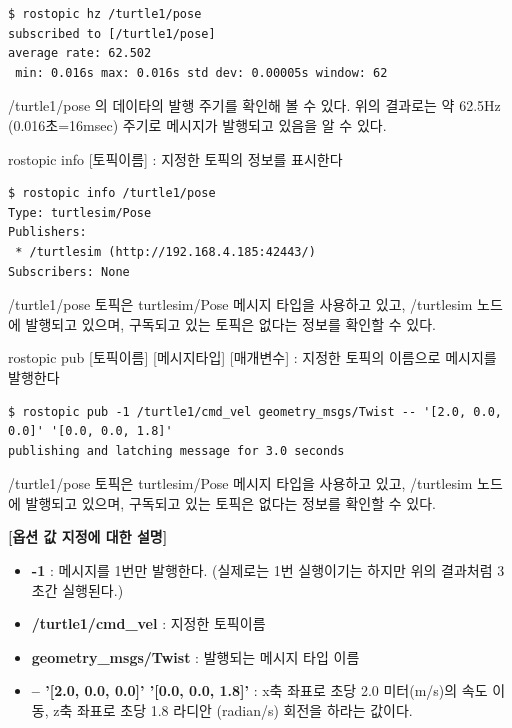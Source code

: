 \begin{lstlisting}[language=ROS]
$ rostopic hz /turtle1/pose 
subscribed to [/turtle1/pose]
average rate: 62.502
 min: 0.016s max: 0.016s std dev: 0.00005s window: 62
\end{lstlisting}

\noindent
/turtle1/pose 의 데이타의 발행 주기를 확인해 볼 수 있다. 위의 결과로는 약 62.5Hz (0.016초=16msec) 주기로 메시지가 발행되고 있음을 알 수 있다.

\vspace{\baselineskip}
\noindent
{}\circled{\thenum} rostopic info [토픽이름] : 지정한 토픽의 정보를 표시한다

\begin{lstlisting}[language=ROS]
$ rostopic info /turtle1/pose 
Type: turtlesim/Pose
Publishers: 
 * /turtlesim (http://192.168.4.185:42443/)
Subscribers: None
\end{lstlisting}

\noindent
/turtle1/pose 토픽은 turtlesim/Pose 메시지 타입을 사용하고 있고, /turtlesim 노드에 발행되고 있으며, 구독되고 있는 토픽은 없다는 정보를 확인할 수 있다. 

\vspace{\baselineskip}
\noindent
{}\circled{\thenum} rostopic pub [토픽이름] [메시지타입] [매개변수] : 지정한 토픽의 이름으로 메시지를 발행한다

\begin{lstlisting}[language=ROS]
$ rostopic pub -1 /turtle1/cmd_vel geometry_msgs/Twist -- '[2.0, 0.0, 0.0]' '[0.0, 0.0, 1.8]'
publishing and latching message for 3.0 seconds
\end{lstlisting}

\noindent
/turtle1/pose 토픽은 turtlesim/Pose 메시지 타입을 사용하고 있고, /turtlesim 노드에 발행되고 있으며, 구독되고 있는 토픽은 없다는 정보를 확인할 수 있다. 

\vspace{\baselineskip}
\noindent
\textbf{[옵션 값 지정에 대한 설명]}
\begin{itemize}[leftmargin=*]
\item \textbf{-1} : 메시지를 1번만 발행한다. (실제로는 1번 실행이기는 하지만 위의 결과처럼 3초간 실행된다.)
\item \textbf{/turtle1/cmd\_vel} : 지정한 토픽이름
\item \textbf{geometry\_msgs/Twist} : 발행되는 메시지 타입 이름
\item \textbf{-- '[2.0, 0.0, 0.0]' '[0.0, 0.0, 1.8]'} : x축 좌표로 초당 2.0 미터(m/s)의 속도 이동, z축 좌표로 초당 1.8 라디안 (radian/s) 회전을 하라는 값이다.
\end{itemize}

